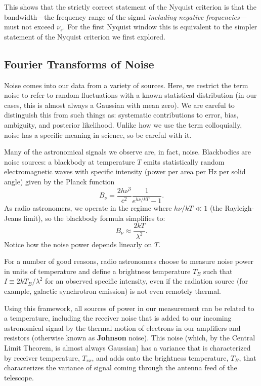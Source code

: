 \documentclass[11pt,preprint]{aastex}
\begin{document}
This shows that the strictly correct statement of the Nyquist criterion
is that the bandwidth---the frequency range of the
signal {\it including negative frequencies}---must not exceed $\nu_s$. For the first Nyquist window this
is equivalent to the simpler statement of the Nyquist criterion we first
explored.

\subsection{Fourier Transforms of Noise}

\noindent
Noise comes into our data from a variety of sources. 
Here, we restrict the term noise to refer to random fluctuations with a known statistical distribution (in
our cases, this is almost always a Gaussian with mean zero). We are careful to distinguish
this from such things as: systematic contributions to error, bias, ambiguity, and posterior likelihood.
Unlike how we use the term colloquially, noise has a specific meaning in science, so be careful with it.

Many of the astronomical signals we observe are, in fact, noise. 
Blackbodies are noise sources: a blackbody at temperature $T$ emits statistically 
random electromagnetic waves
with specific intensity (power per area per Hz per solid angle) given by the 
Planck function
\begin{equation}
B_\nu = \frac{2h\nu^3}{c^2}\frac{1}{e^{h\nu/kT}-1}. 
\end{equation}
As radio astronomers, we
operate in the regime where $h\nu/kT \ll 1$ (the Rayleigh-Jeans limit), 
so the blackbody formula simplifies to:
\begin{equation}
B_\nu\approx\frac{2kT}{\lambda^2}. 
\end{equation}
Notice how the noise power depends linearly on $T$. 

For a number of good reasons, radio astronomers choose to measure noise
power in units of temperature and define a brightness temperature
$T_B$ such that $I\equiv2kT_B/\lambda^2$ for an observed specific intensity,
even if the radiation source (for example, galactic synchrotron emission) is not even remotely thermal.

Using this framework, all sources of power in our measurement can be related to a temperature,
including the receiver noise that is added to our incoming astronomical signal 
by the thermal motion of electrons in our amplifiers and resistors 
(otherwise known as {\bf Johnson} noise).  This noise (which,
by the Central Limit Theorem, is almost always Gaussian) has a variance that
is characterized by receiver temperature, $T_{rx}$, and adds onto the brightness temperature, $T_B$, 
that characterizes the variance of signal coming through the antenna feed of the telescope.
\end{document}

